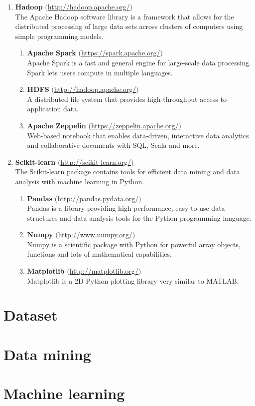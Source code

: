 \begin{enumerate}
    \item \textbf{Hadoop} $($\url{http://hadoop.apache.org/}$)$ \\
    The Apache Hadoop software library is a framework that allows for the distributed processing of large data sets across clusters of computers using simple programming models. 
    \begin{enumerate}
        \item \textbf{Apache Spark} $($\url{https://spark.apache.org/}$)$\\
        Apache Spark is a fast and general engine for large-scale data processing. Spark lets users compute in multiple languages.
        \item \textbf{HDFS} $($\url{http://hadoop.apache.org/}$)$ \\
         A distributed file system that provides high-throughput access to application data.
         \item \textbf{Apache Zeppelin} $($\url{https://zeppelin.apache.org/}$)$ \\
         Web-based notebook that enables data-driven, interactive data analytics and collaborative documents with SQL, Scala and more.
    \end{enumerate}
    
    \item \textbf{Scikit-learn} $($\url{http://scikit-learn.org/}$)$ \\
    The Scikit-learn package contains tools for effici\"ent data mining and data analysis with machine learning in Python.
    \begin{enumerate}
        \item \textbf{Pandas} $($\url{http://pandas.pydata.org/}$)$ \\
        Pandas is a library providing high-performance, easy-to-use data structures and data analysis tools for the Python programming language.
        \item \textbf{Numpy} $($\url{http://www.numpy.org/}$)$ \\
        Numpy is a scientific package with Python for powerful array objects, functions and lots of mathematical capabilities.
        \item \textbf{Matplotlib} $($\url{http://matplotlib.org/}$)$ \\
        Matplotlib is a 2D Python plotting library very similar to MATLAB.
        
    \end{enumerate}
    
\end{enumerate}

\section{Dataset}

\section{Data mining}


\section{Machine learning}

